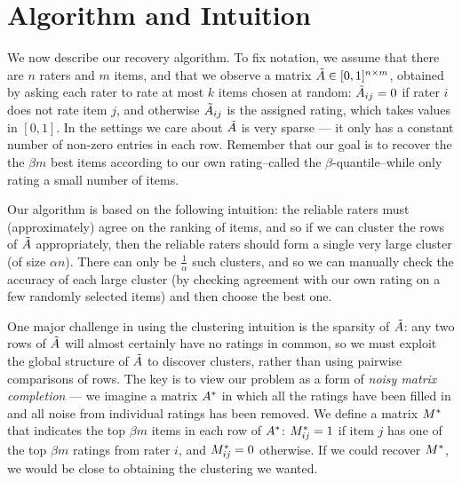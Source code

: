\section{Algorithm and Intuition}
\label{sec:algorithm}




We now describe our recovery algorithm. To fix notation, we assume that 
there are $n$ raters and $m$ items, and that we observe a matrix 
$\tilde{A} \in [0,1]^{n \times m}$, obtained by asking each rater to rate at most $k$ 
items chosen at random: $\tilde{A}_{ij} = 0$ if rater $i$ does not rate item 
$j$, and otherwise $\tilde{A}_{ij}$ is the assigned rating, which takes values 
in $[0,1]$. In the settings we 
care about $\tilde{A}$ is very sparse --- it only has a constant number of 
non-zero entries in each row. Remember that our goal is to recover the 
the $\beta m$ best items according to our own rating--called the $\beta$-quantile--while only rating a 
small number of items.

Our algorithm is based on the following intuition: the reliable raters must 
(approximately) agree on the ranking of items, and so if we can cluster the 
rows of $\tilde{A}$ appropriately, then the reliable raters should form a single very large cluster 
(of size $\alpha n$). There can only be $\frac{1}{\alpha}$ such clusters, and 
so we can manually check the accuracy of each large cluster (by checking agreement 
with our own rating on a few randomly selected items) and 
then choose the best one.

One major challenge in using the clustering intuition is the sparsity of 
$\tilde{A}$: any two rows of $\tilde{A}$ will almost certainly have no ratings in common, 
so we must exploit the global structure of $\tilde{A}$ to discover 
clusters, rather than using pairwise comparisons of rows.
The key is to view our problem as a form of \emph{noisy matrix completion} --- 
we imagine a matrix $A^*$ in which all the ratings have been filled in 
and all noise from individual ratings has been removed. We define a 
matrix $M^*$ that indicates the top $\beta m$ items in each row of $A^*$: 
$M^*_{ij} = 1$ if item $j$ has one of the top $\beta m$ ratings from rater $i$, 
and $M^*_{ij} = 0$ otherwise. If we could recover $M^*$, we would be 
close to obtaining the clustering we wanted.

